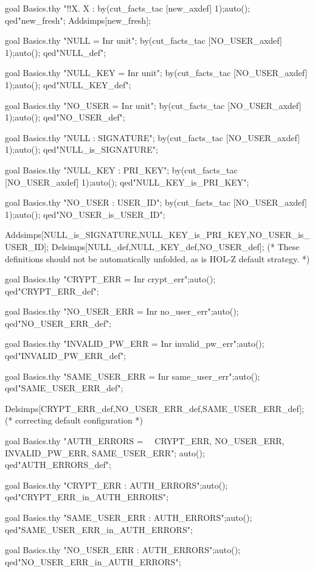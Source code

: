 \documentclass[a4paper,pdftex]{article}
\newenvironment{holz-proof}{\comment}{\endcomment}
\begin{document}
\begin{holz-proof}

goal Basics.thy "!!X. X : %
by(cut_facts_tac [new_axdef] 1);auto();
qed"new_fresh";
Addsimps[new_fresh];

goal Basics.thy "NULL = Inr unit";
by(cut_facts_tac [NO_USER_axdef] 1);auto();
qed"NULL_def";

goal Basics.thy "NULL_KEY = Inr unit";
by(cut_facts_tac [NO_USER_axdef] 1);auto();
qed"NULL_KEY_def";

goal Basics.thy "NO_USER = Inr unit";
by(cut_facts_tac [NO_USER_axdef] 1);auto();
qed"NO_USER_def";


goal Basics.thy "NULL : SIGNATURE";
by(cut_facts_tac [NO_USER_axdef] 1);auto();
qed"NULL_is_SIGNATURE";

goal Basics.thy "NULL_KEY : PRI_KEY";
by(cut_facts_tac [NO_USER_axdef] 1);auto();
qed"NULL_KEY_is_PRI_KEY";

goal Basics.thy "NO_USER : USER_ID";
by(cut_facts_tac [NO_USER_axdef] 1);auto();
qed"NO_USER_is_USER_ID";

Addsimps[NULL_is_SIGNATURE,NULL_KEY_is_PRI_KEY,NO_USER_is_USER_ID];
Delsimps[NULL_def,NULL_KEY_def,NO_USER_def];
(* These definitions should not be automatically unfolded,
   as is HOL-Z default strategy. *)


goal Basics.thy "CRYPT_ERR = Inr crypt_err";auto();
qed"CRYPT_ERR_def";

goal Basics.thy "NO_USER_ERR = Inr no_user_err";auto();
qed"NO_USER_ERR_def";

goal Basics.thy "INVALID_PW_ERR = Inr invalid_pw_err";auto();
qed"INVALID_PW_ERR_def";

goal Basics.thy "SAME_USER_ERR = Inr same_user_err";auto();
qed"SAME_USER_ERR_def";

Delsimps[CRYPT_ERR_def,NO_USER_ERR_def,SAME_USER_ERR_def]; 
(* correcting default configuration *)

goal Basics.thy 
"AUTH_ERRORS =                                           \
\ {CRYPT_ERR, NO_USER_ERR, INVALID_PW_ERR, SAME_USER_ERR}";
auto();
qed"AUTH_ERRORS_def";



goal Basics.thy "CRYPT_ERR : AUTH_ERRORS";auto();
qed"CRYPT_ERR_in_AUTH_ERRORS";

goal Basics.thy "SAME_USER_ERR : AUTH_ERRORS";auto();
qed"SAME_USER_ERR_in_AUTH_ERRORS";

goal Basics.thy "NO_USER_ERR : AUTH_ERRORS";auto();
qed"NO_USER_ERR_in_AUTH_ERRORS";


\end{holz-proof}
\end{document}

